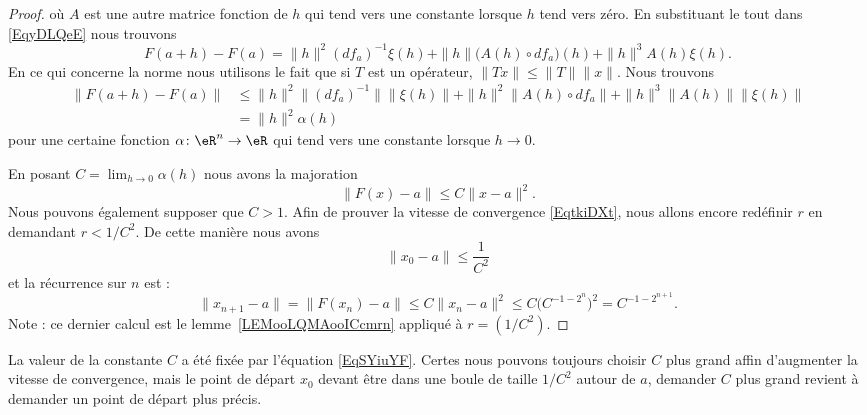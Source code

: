 \begin{proof}
        où \( A\) est une autre matrice fonction de \(h\) qui tend vers une constante lorsque \( h\) tend vers zéro. En substituant le tout dans \eqref{EqyDLQeE} nous trouvons
        \begin{equation}
            F(a+h)-F(a)=\| h \|^2(df_a)^{-1}\xi(h)+\| h \|\big( A(h)\circ df_a \big)(h)+\| h \|^3A(h)\xi(h).
        \end{equation}
        En ce qui concerne la norme nous utilisons le fait que si \( T\) est un opérateur, \( \| Tx \|\leq \| T \|\| x \|\). Nous trouvons
        \begin{subequations}
            \begin{align}
                \| F(a+h)-F(a) \|&\leq \| h \|^2\| (df_a)^{-1} \|\| \xi(h) \|+\| h \|^2\| A(h)\circ df_a \|+\| h \|^3\| A(h) \|\| \xi(h) \|\\
                &=\| h \|^2\alpha(h)
            \end{align}
        \end{subequations}
    pour une certaine fonction \( \alpha\colon \eR^n\to \eR\) qui tend vers une constante lorsque \( h\to 0\).

    En posant \( C=\lim_{h\to 0}\alpha(h) \) nous avons la majoration
    \begin{equation}        \label{EqSYiuYF}
        \| F(x)-a \|\leq C\| x-a \|^2.
    \end{equation}
    Nous pouvons également supposer que \( C>1\). Afin de prouver la vitesse de convergence \eqref{EqtkiDXt}, nous allons encore redéfinir \( r\) en demandant \( r<1/C^2\). De cette manière nous avons
    \begin{equation}
        \| x_0-a \|\leq \frac{1}{ C^2 }
    \end{equation}
    et la récurrence sur \( n\) est :
    \begin{equation}
        \| x_{n+1}-a \|=\| F(x_n)-a \|\leq C\| x_n-a \|^2\leq C\big( C^{-1-2^n} \big)^2=C^{-1-2^{n+1}}.
    \end{equation}
    Note : ce dernier calcul est le lemme~\ref{LEMooLQMAooICcmrn} appliqué à \( r=(1/C^2)\).
\end{proof}

\begin{remark}
    La valeur de la constante \( C\) a été fixée par l'équation \eqref{EqSYiuYF}. Certes nous pouvons toujours choisir \( C\) plus grand affin d'augmenter la vitesse de convergence, mais le point de départ \( x_0\) devant être dans une boule de taille \( 1/C^2\) autour de \( a\), demander \( C \) plus grand revient à demander un point de départ plus précis.
\end{remark}
